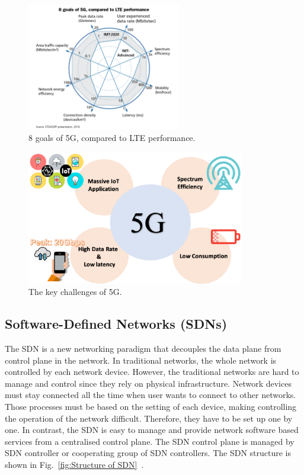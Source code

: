 \documentclass[graybox]{svmult}
\begin{document}
 \begin{figure}[h!]\centering
	\includegraphics[width=0.6\textwidth]{figure/4G&5G.png}
	\caption{8 goals of 5G, compared to LTE performance.}\label{fig:4G5G}
\end{figure}
\begin{figure}[h!]\centering
	\includegraphics[width=0.85\textwidth]{figure/5G.eps}
	\caption{The key challenges of 5G.}\label{fig:5Gch}
\end{figure}



\subsection{Software-Defined Networks (SDNs)}
\label{sec:sdn}
The SDN is  a new networking paradigm that decouples the data plane from control plane in the network. In traditional networks, the whole network is controlled by each network device. However, the traditional networks are hard to manage and control since they rely on physical infrastructure. Network devices must stay connected all the time when user wants to connect to other networks. Those processes must be based on the setting of each device, making controlling the operation of the network difficult. Therefore, they have to be set up one by one. In contrast, the SDN is easy to manage and provide network software based services from a centralised control plane. The SDN control plane is managed by SDN controller or cooperating group of SDN controllers. The SDN structure is shown in Fig.~\ref{fig:Structure of SDN}~\cite{6385040,mousa2016software}.
 
\end{document}
